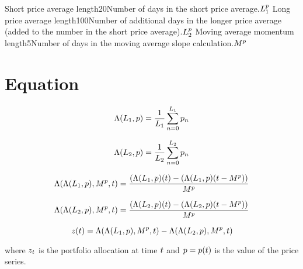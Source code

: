 \documentclass{article}
\begin{document}
\logo

\tblofcontents
{}

{Short price average length}{20}{Number of days in the short price
average.}{$L_{1}^{p}$}
{Long price average length}{100}{Number of additional days in the longer price average (added to the number in the short price average).}{$L_{2}^{p}$}
{Moving average momentum length}{5}{Number of days in the moving
average slope calculation.}{$M^{p}$}
\stoptable


\section{Equation}

\begin{equation}
\Lambda(L_{1}, p) = \frac{1}{L_{1}} \sum_{n=0}^{L_{1}} p_{n}
\end{equation}

\begin{equation}
\Lambda(L_{2}, p) = \frac{1}{L_{2}} \sum_{n=0}^{L_{2}} p_{n}
\end{equation}

\begin{equation}
\Lambda(\Lambda(L_{1}, p), M^{p}, t) = \frac
{(\Lambda(L_{1}, p)(t) -
(\Lambda(L_{1}, p)(t - M^{p}))}
{M^{p}}
\end{equation}

\begin{equation}
\Lambda(\Lambda(L_{2}, p), M^{p}, t) = \frac
{(\Lambda(L_{2}, p)(t) -
(\Lambda(L_{2}, p)(t - M^{p}))}
{M^{p}}
\end{equation}

\begin{equation}
z(t) =
\Lambda(\Lambda(L_{1}, p), M^{p}, t) - \Lambda(\Lambda(L_{2}, p), M^{p}, t)
\end{equation}

\hspace{200mm}

\noindent where $z_t$ is the portfolio allocation at time $t$ and $p = p(t)$ is the value of the price series.

\hspace{200mm}
\hspace{200mm}

\keyterms

\furtherlinks
\end{document}
